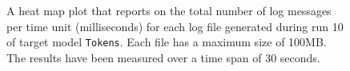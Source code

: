 \begin{figure}[htbp]
\centering
\begin{minipage}{1\textwidth}
  \centering
\end{minipage}
\caption{A heat map plot that reports on the total number of log messages per time unit (milliseconds) for each log file generated during run 10 of target model \texttt{Tokens}. Each file has a maximum size of 100MB. The results have been measured over a time span of 30 seconds.}
\label{figure:throughput_sum_tokens_10}
\end{figure}